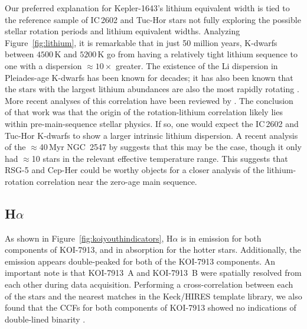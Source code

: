 \documentclass[12pt,twocolumn]{aastex63}
\begin{document}
Our preferred explanation for Kepler-1643's lithium equivalent
width is tied to the reference sample of IC\,2602 and Tuc-Hor
stars not fully exploring the possible stellar rotation
periods and lithium equivalent widths. 
Analyzing Figure~\ref{fig:lithium}, it is remarkable that in
just 50 million years, K-dwarfs between $4500$\,K and $5200$\,K go from
having a relatively tight lithium sequence to one with a dispersion
$\approx10\times$ greater.  The existence of the Li dispersion in
Pleiades-age K-dwarfs has been known for decades; it has also been
known that the stars with the largest lithium abundances are also the
most rapidly rotating
\citep{butler_pleiades_1987,soderblom_evolution_1993}.  More recent
analyses of this correlation have been reviewed by
\citet{bouvier_lithium-rotation_2020}.  The conclusion of that work
was that the origin of the rotation-lithium correlation likely lies
within pre-main-sequence stellar physics.  If so, one would expect the
IC\,2602 and Tuc-Hor K-dwarfs to show a larger intrinsic lithium
dispersion.  A recent analysis of the $\approx$40\,Myr
NGC~2547 by \citet{binks_2022} suggests that this may
be the case, though it only had $\approx$10 stars in the relevant
effective temperature range.
This suggests that
RSG-5 and Cep-Her could be
worthy objects for a closer analysis of the lithium-rotation correlation
near the zero-age main sequence.

\subsection{H$\alpha$}

As shown in Figure~\ref{fig:koiyouthindicators}, H$\alpha$ is in
emission for both components of KOI-7913, and in absorption for the
hotter stars.  Additionally, the emission appears double-peaked for
both of the KOI-7913 components.  An important note is that KOI-7913~A and
KOI-7913~B were spatially resolved from each other during data
acquisition.  Performing a cross-correlation between each of the stars
and the nearest matches in the Keck/HIRES template library, we also
found that the CCFs for both components of KOI-7913 showed no
indications of double-lined binarity \citep{kolbl_detection_2015}.
\end{document}
